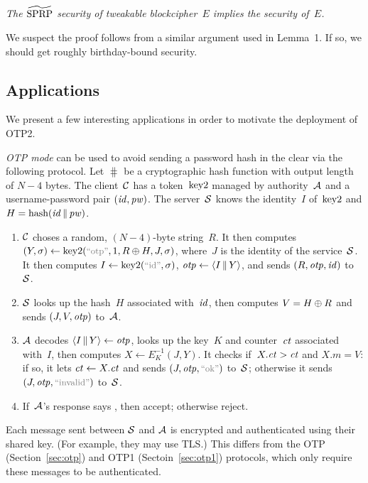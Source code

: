  \emph{The $\widetilde{\textnormal{SPRP}}$ security of tweakable
blockcipher~$E$ implies the \otpsec security of~$E$.}

\noindent
We suspect the proof follows from a similar argument used in Lemma~1.
If so, we should get roughly birthday-bound security.


\subsection{Applications}
\label{sec:apps}
We present a few interesting applications in order to motivate the deployment of
OTP2.

\newcommand{\id}{\varfont{id}}
\newcommand{\pw}{\varfont{pw}}
%
\emph{OTP mode} can be used to avoid sending a password hash in the clear via the
following protocol. Let $\hash$ be a cryptographic hash function with output
length of $N-4$ bytes. The client~$\mathcal{C}$ has a token~$\textnormal{key2}$ managed by
authority~$\mathcal{A}$ and a username-password pair $(\id, \pw)$. The
server~$\mathcal{S}$ knows the identity~$I$ of~$\textnormal{key2}$ and $H = \hash(\id \cat
\pw)$.
%
\begin{enumerate}
  \item $\mathcal{C}$ choses a random, $(N-4)$-byte string~$R$.
    It then computes $(Y, \sigma) \gets \fancykey(\stringer{otp}, 1, R
    \xor H, J, \sigma)$, where~$J$ is the identity of the service~$\mathcal{S}$.
    It then computes $I \gets \fancykey(\stringer{id}, \sigma)$, $\otp \gets
    \str(I \cat Y)$, and sends $(R, \otp, \id)$ to~$\mathcal{S}$.

  \item $\mathcal{S}$ looks up the hash~$H$ associated with~$\id$, then computes $V
    = H\mathbin{\oplus} R$ and sends $(J, V, \mathit{otp})$ to~$\mathcal{A}$.

  \item $\mathcal{A}$ decodes $\str(I \cat Y) \gets \otp$, looks up the key~$K$ and
    counter~$\mathit{ct}$ associated with~$I$, then computes $X \gets E^{-1}_K(J, Y)$.
    It checks if~$X.\mathit{ct} > \mathit{ct}$ and $X.m = V$: if so, it lets $\mathit{ct} \gets X.\mathit{ct}$
    and sends $(J, \otp, \stringer{ok})$ to~$\mathcal{S}$; otherwise it sends $(J,
    \otp, \stringer{invalid})$ to~$\mathcal{S}$.

  \item If~$\mathcal{A}$'s response says , then accept; otherwise reject.
\end{enumerate}
Each message sent between $\mathcal{S}$ and $\mathcal{A}$ is encrypted and authenticated
using their shared key. (For example, they may use TLS.) This differs from
the OTP (Section~\ref{sec:otp}) and OTP1 (Sectoin~\ref{sec:otp1}) protocols,
which only require these messages to be authenticated.

